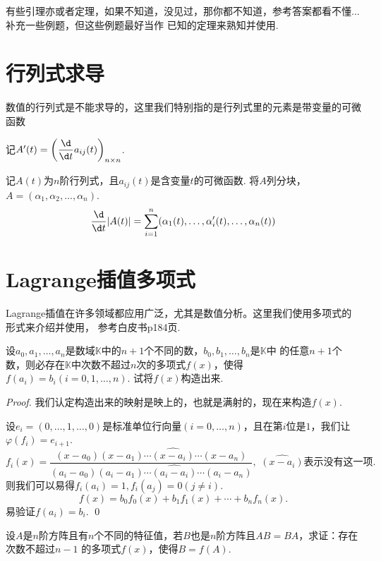 有些引理亦或者定理，如果不知道，没见过，那你都不知道，参考答案都看不懂... 补充一些例题，但这些例题最好当作
已知的定理来熟知并使用.

\section*{行列式求导}

数值的行列式是不能求导的，这里我们特别指的是行列式里的元素是带变量的可微函数

\vspace{0.2cm}
记$A^\prime(t) =
\left( \dfrac{\d}{\d t} a_{ij}(t) \right)_{n\times n}$.

\begin{lemma}
	记$A(t)$为$n$阶行列式，且$a_{ij}(t)$是含变量$t$的可微函数. 将$A$列分块，$A=(\alpha_1, \alpha_2, \dots, \alpha_n)$.
	\begin{align*}
		\dfrac{\d}{\d t} | A(t) | = \sum _ {i=1} ^n (\alpha_1(t), \dots, \alpha^\prime_i(t),\dots,\alpha_n(t))
	\end{align*}
\end{lemma}

\section*{Lagrange插值多项式}

Lagrange插值在许多领域都应用广泛，尤其是数值分析。这里我们使用多项式的形式来介绍并使用，
参考白皮书p184页. 

\begin{lemma}
	设$a_0,a_1,\dots,a_n$是数域$\mathbb{K}$中的$n+1$个不同的数，$b_0,b_1,\dots,b_n$是$\mathbb{K}$中
	的任意$n+1$个数，则必存在$\mathbb{K}$中次数不超过$n$次的多项式$f(x)$，使得$f(a_i)=b_i(i=0,1,\dots,n)$. 
	试将$f(x)$构造出来.
\end{lemma}

\begin{proof}
	我们认定构造出来的映射是映上的，也就是满射的，现在来构造$f(x)$.

	设$e_i=(0,\dots,1,\dots,0)$是标准单位行向量$(i=0,\dots,n)$，且在第$i$位是$1$，我们让$\varphi(f_i)=e_{i+1}$.
	$$
		f_i(x) = \dfrac{(x-a_0)(x-a_1)\cdots\widehat{(x-a_i)}\cdots(x-a_n)}{(a_i-a_0)(a_i-a_1)\cdots\widehat{(a_i-a_i)}\cdots(a_i-a_n)}, \,\, 
		\widehat{(x-a_i)}\text{表示没有这一项}.
	$$
	则我们可以易得$f_i(a_i)=1, f_i(a_j)=0(j\neq i)$.
	$$
		f(x) = b_0f_0(x) + b_1f_1(x) + \cdots + b_nf_n(x).
	$$
	易验证$f(a_i)=b_i$.
	\qed{}
\end{proof}

\begin{proposition}
	设$A$是$n$阶方阵且有$n$个不同的特征值，若$B$也是$n$阶方阵且$AB=BA$，求证：存在次数不超过$n-1$
	的多项式$f(x)$，使得$B=f(A)$.
\end{proposition}

